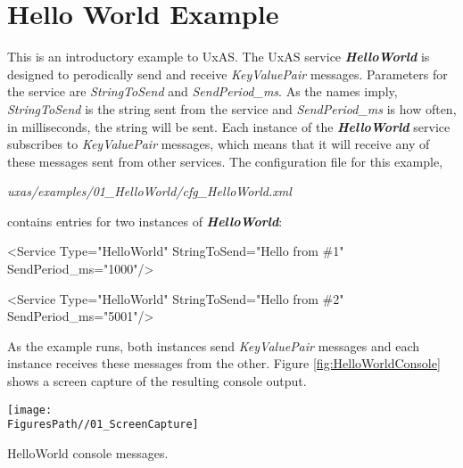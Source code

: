 
\section{Hello World Example}
This is an introductory example to UxAS. The UxAS service \textbf{\textit{HelloWorld}} is designed to perodically send and receive \textit{KeyValuePair} messages. Parameters for the service are \textit{StringToSend} and \textit{SendPeriod\_ms}. As the names imply, \textit{StringToSend} is the string sent from the service and \textit{SendPeriod\_ms} is how often, in milliseconds, the string will be sent. Each instance of the \textbf{\textit{HelloWorld}} service subscribes to \textit{KeyValuePair} messages, which means that it will receive any of these messages sent from other services. The configuration file for this example,
\begin{docspec}
\textit{uxas/examples/01\_HelloWorld/cfg\_HelloWorld.xml}
\end{docspec}
contains entries for two instances of \textbf{\textit{HelloWorld}}:

\begin{fullwidth}
\begin{docspec}
    <Service Type="HelloWorld" StringToSend="Hello from \#1" SendPeriod\_ms="1000"/>
\end{docspec}
\begin{docspec}
    <Service Type="HelloWorld" StringToSend="Hello from \#2" SendPeriod\_ms="5001"/>
\end{docspec}
\end{fullwidth}

As the example runs, both instances send \textit{KeyValuePair} messages and each instance receives these messages from the other. Figure \ref{fig:HelloWorldConsole} shows a screen capture of the resulting console output. 

\begin{marginfigure}[100pt]
	\texttt{[image: \\FiguresPath//01\_ScreenCapture]}
	\caption{HelloWorld console messages.}
	\label{fig:HelloWorldConsole}
\end{marginfigure}

